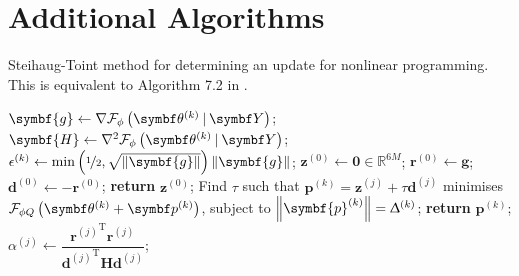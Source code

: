 \clearpage
\section{Additional Algorithms}

\begin{algorithm}
    \caption[
        Steihaug-Toint method for determining an update for nonlinear
        programming.
    ]{
        Steihaug-Toint method for determining an update for nonlinear
        programming. This is equivalent to Algorithm 7.2 in \cite{Nocedal2006}.
    }
    \label{alg:steihaug-toint}
    \begin{algorithmic}[1]
            \State $\symbf{g} \gets \nabla \FphithkY$;
            \State $\symbf{H} \gets \nabla^2 \FphithkY$;
            \State $\epsilon^{(k)} \gets \min\left(
                    \nicefrac{1}{2},
                    \sqrt{\left\lVert \symbf{g} \right\rVert}
                \right)
                \left\lVert \symbf{g} \right\rVert
                $;
            \State $\symbf{z}^{(0)} \gets \symbf{0} \in \mathbb{R}^{6M}$;
            \State $\symbf{r}^{(0)} \gets \symbf{g}$;
            \State $\symbf{d}^{(0)} \gets -\symbf{r}^{(0)}$;
                \State \textbf{return} $\symbf{z}^{(0)}$;
            \EndIf
                \State Find $\tau$ such that $\symbf{p}^{(k)} = \symbf{z}^{(j)} + \tau \symbf{d}^{(j)}$
                    minimises $\FphiQthkpk$, subject to
                    $\left \lVert \symbf{p}^{(k)} \right \rVert = \trustradius{k}$;
                    \State \textbf{return} $\symbf{p}^{(k)}$;
                \EndIf
                \State $\alpha^{(j)} \gets \dfrac
                    {{\symbf{r}^{(j)}}^{\mathrm{T}} \symbf{r}^{(j)}}
                    {
                        {\symbf{d}^{(j)}}^{\mathrm{T}}
                        \symbf{H}
                        \symbf{d}^{(j)}
                    }$;

\end{algorithmic}
\end{algorithm}
